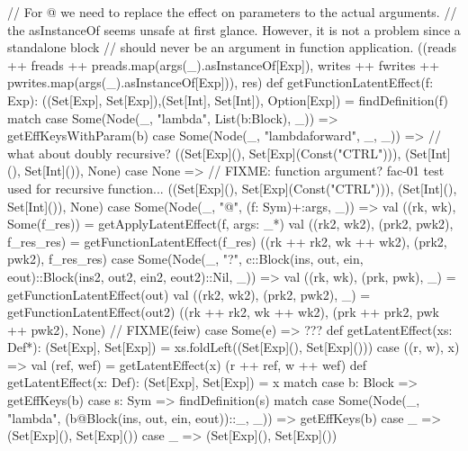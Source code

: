 \begin{listing}[scala]
{    // For @ we need to replace the effect on parameters to the actual arguments.
    // the asInstanceOf seems unsafe at first glance. However, it is not a problem since a standalone block
    // should never be an argument in function application.
    ((reads ++ freads ++ preads.map(args(_).asInstanceOf[Exp]), writes ++ fwrites ++ pwrites.map(args(_).asInstanceOf[Exp])), res)
}
def getFunctionLatentEffect(f: Exp): ((Set[Exp], Set[Exp]),(Set[Int], Set[Int]), Option[Exp]) = findDefinition(f) match {
      case Some(Node(_, "lambda", List(b:Block), _)) =>
        getEffKeysWithParam(b)
      case Some(Node(_, "lambdaforward", _, _)) => // what about doubly recursive?
        ((Set[Exp](), Set[Exp](Const("CTRL"))), (Set[Int](), Set[Int]()), None)
      case None => // FIXME: function argument? fac-01 test used for recursive function...
        ((Set[Exp](), Set[Exp](Const("CTRL"))), (Set[Int](), Set[Int]()), None)
      case Some(Node(_, "@", (f: Sym)+:args, _)) =>
        val ((rk, wk), Some(f_res)) = getApplyLatentEffect(f, args: _*)
        val ((rk2, wk2), (prk2, pwk2), f_res_res) = getFunctionLatentEffect(f_res)
        ((rk ++ rk2, wk ++ wk2), (prk2, pwk2), f_res_res)
      case Some(Node(_, "?", c::Block(ins, out, ein, eout)::Block(ins2, out2, ein2, eout2)::Nil, _)) =>
        val ((rk, wk), (prk, pwk), _) = getFunctionLatentEffect(out)
        val ((rk2, wk2), (prk2, pwk2), _) = getFunctionLatentEffect(out2)
        ((rk ++ rk2, wk ++ wk2), (prk ++ prk2, pwk ++ pwk2), None) // FIXME(feiw)
      case Some(e) => ???
}
def getLatentEffect(xs: Def*): (Set[Exp], Set[Exp]) =
    xs.foldLeft((Set[Exp](), Set[Exp]())) { case ((r, w), x) =>
      val (ref, wef) = getLatentEffect(x)
      (r ++ ref, w ++ wef)
    }
def getLatentEffect(x: Def): (Set[Exp], Set[Exp]) = x match {
    case b: Block => getEffKeys(b)
    case s: Sym => findDefinition(s) match {
        case Some(Node(_, "lambda", (b@Block(ins, out, ein, eout))::_, _)) => getEffKeys(b)
        case _ => (Set[Exp](), Set[Exp]())
    }
    case _ => (Set[Exp](), Set[Exp]())
}
\end{listing}

